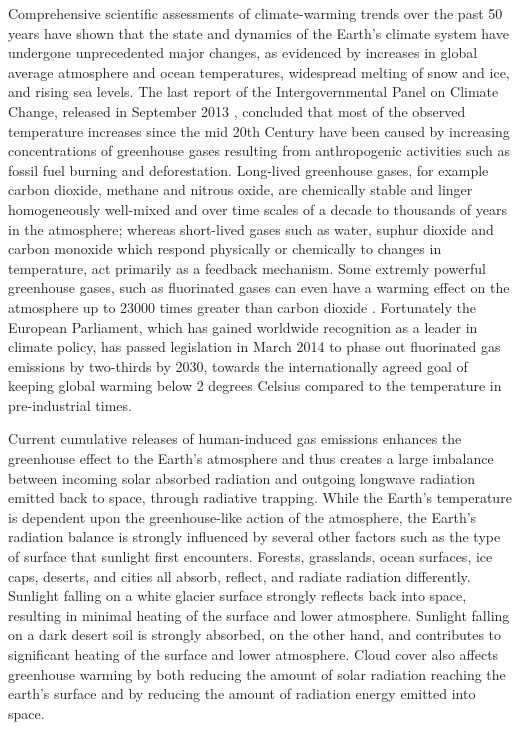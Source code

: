 Comprehensive  scientific assessments  of climate-warming  trends over
the  past 50  years have  shown  that the  state and  dynamics of  the
Earth's climate system have  undergone unprecedented major changes, as
evidenced  by  increases  in   global  average  atmosphere  and  ocean
temperatures,  widespread melting  of  snow and  ice,  and rising  sea
levels.   The last report  of the  Intergovernmental Panel  on Climate
Change, released  in September 2013  \citep{IPCC-2013}, concluded that
most of the observed temperature  increases since the mid 20th Century
have  been caused  by  increasing concentrations  of greenhouse  gases
resulting from  anthropogenic activities  such as fossil  fuel burning
and  deforestation.  Long-lived greenhouse  gases, for  example carbon
dioxide, methane  and nitrous oxide, are chemically  stable and linger
homogeneously well-mixed and over time scales of a decade to thousands
of years in  the atmosphere; whereas short-lived gases  such as water,
suphur  dioxide  and  carbon  monoxide  which  respond  physically  or
chemically  to changes  in temperature,  act primarily  as  a feedback
mechanism.   Some   extremly  powerful  greenhouse   gases,  such  as
fluorinated gases can even have  a warming effect on the atmosphere up
to  23000  times  greater  than  carbon  dioxide  \citep{Zehner-2012}.
Fortunately  the  European  Parliament,  which  has  gained  worldwide
recognition as a  leader in climate policy, has  passed legislation in
March 2014  to phase  out fluorinated gas  emissions by  two-thirds by
2030,  towards  the  internationally  agreed goal  of  keeping  global
warming  below  2  degrees  Celsius  compared to  the  temperature  in
pre-industrial times.

Current  cumulative releases of  human-induced gas  emissions enhances
the greenhouse  effect to  the Earth's atmosphere  and thus  creates a
large imbalance between incoming solar absorbed radiation and outgoing
longwave radiation emitted back  to space, through radiative trapping.
While the  Earth's temperature  is dependent upon  the greenhouse-like
action of  the atmosphere, the  Earth's radiation balance  is strongly
influenced by several  other factors such as the  type of surface that
sunlight first  encounters.  Forests, grasslands,  ocean surfaces, ice
caps, deserts,  and cities all absorb, reflect,  and radiate radiation
differently.   Sunlight falling  on a  white glacier  surface strongly
reflects back into space, resulting  in minimal heating of the surface
and  lower atmosphere.   Sunlight falling  on  a dark  desert soil  is
strongly absorbed,  on the other hand, and  contributes to significant
heating of the surface and lower atmosphere.  Cloud cover also affects
greenhouse  warming by  both reducing  the amount  of  solar radiation
reaching the earth's  surface and by reducing the  amount of radiation
energy emitted into space.

